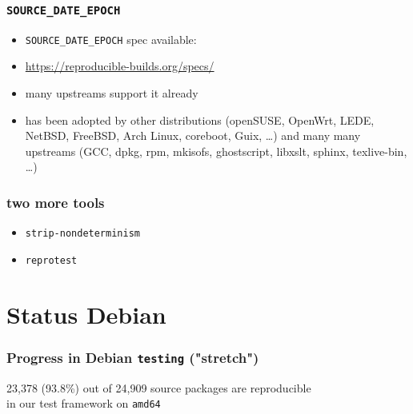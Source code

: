 \documentclass[14pt]{beamer}
\newif\ifplacelogo
\begin{document}
\begin{frame}
 \frametitle{\texttt{SOURCE\_DATE\_EPOCH}}

 \begin{itemize}
  \item \texttt{SOURCE\_DATE\_EPOCH} spec available:
  \item \url{https://reproducible-builds.org/specs/}
  \item many upstreams support it already
  \item has been adopted by other distributions
  (openSUSE, OpenWrt, LEDE, NetBSD, FreeBSD, Arch Linux, coreboot, Guix, …) and many many
  upstreams (GCC, dpkg, rpm, mkisofs, ghostscript, libxslt, sphinx,
  texlive-bin, …)
 \end{itemize}
\end{frame}

\begin{frame}
 \frametitle{two more tools}

 \begin{itemize}
  \item \texttt{strip-nondeterminism} 
  \item<2> \texttt{reprotest} 
 \end{itemize}
\end{frame}

\placelogotrue

\section{Status Debian}

\begin{frame}
 \frametitle{Progress in Debian \texttt{testing} ("stretch")}
 \begin{center}
  \footnotesize{23,378 (93.8\%) out of 24,909 source packages are reproducible \\
    in our test framework on \texttt{amd64}}
  \vfill
 \end{center}
\end{frame}
\end{document}
